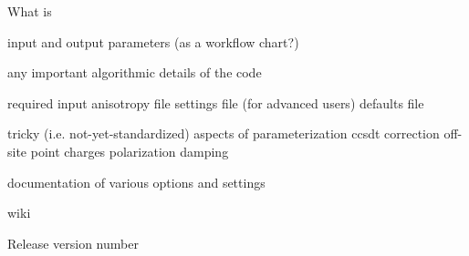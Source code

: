 What is \pointer

input and output parameters (as a workflow chart?)

any important algorithmic details of the code

required input
    anisotropy file
    settings file
    (for advanced users) defaults file

tricky (i.e. not-yet-standardized) aspects of parameterization
    ccsdt correction
    off-site point charges
    polarization damping

documentation of various options and settings

wiki

Release version number
